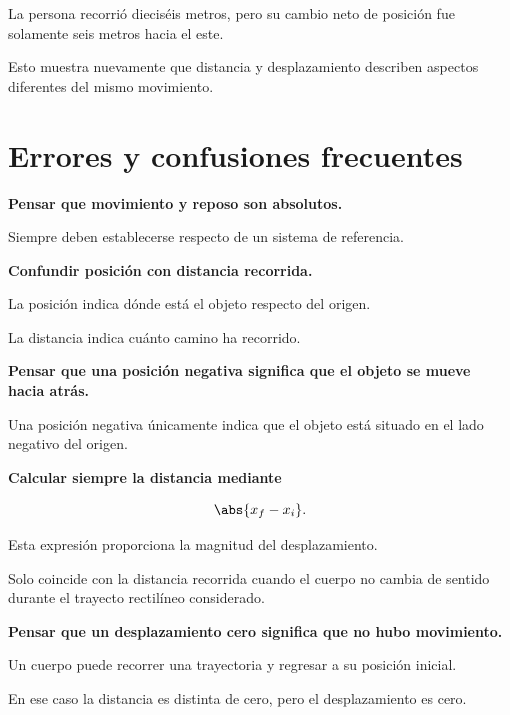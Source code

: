 \begin{interpretacion}
La persona recorrió dieciséis metros, pero su cambio neto de posición fue
solamente seis metros hacia el este.

Esto muestra nuevamente que distancia y desplazamiento describen aspectos
diferentes del mismo movimiento.
\end{interpretacion}


\section{Errores y confusiones frecuentes}

\begin{errorfrecuente}
\textbf{Pensar que movimiento y reposo son absolutos.}

Siempre deben establecerse respecto de un sistema de referencia.
\end{errorfrecuente}

\begin{errorfrecuente}
\textbf{Confundir posición con distancia recorrida.}

La posición indica dónde está el objeto respecto del origen.

La distancia indica cuánto camino ha recorrido.
\end{errorfrecuente}

\begin{errorfrecuente}
\textbf{Pensar que una posición negativa significa que el objeto se mueve
hacia atrás.}

Una posición negativa únicamente indica que el objeto está situado en el
lado negativo del origen.
\end{errorfrecuente}

\begin{errorfrecuente}
\textbf{Calcular siempre la distancia mediante}

\[ \abs{x_f-x_i}. \]

Esta expresión proporciona la magnitud del desplazamiento.

Solo coincide con la distancia recorrida cuando el cuerpo no cambia de
sentido durante el trayecto rectilíneo considerado.
\end{errorfrecuente}

\begin{errorfrecuente}
\textbf{Pensar que un desplazamiento cero significa que no hubo movimiento.}

Un cuerpo puede recorrer una trayectoria y regresar a su posición inicial.

En ese caso la distancia es distinta de cero, pero el desplazamiento es cero.
\end{errorfrecuente}

